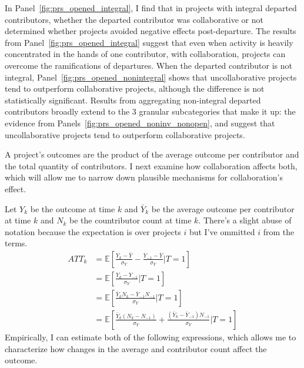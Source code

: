\documentclass[12pt,notitlepage]{article}
\begin{document}
In Panel~\ref{fig:prs_opened_integral}, I find that in projects with integral departed contributors, whether the departed contributor was collaborative or not determined whether projects avoided negative effects post-departure. The results from Panel~\ref{fig:prs_opened_integral} suggest that even when activity is heavily concentrated in the hands of one contributor, with collaboration, projects can overcome the ramifications of departures. When the departed contributor is not integral, Panel~\ref{fig:prs_opened_nonintegral} shows that uncollaborative projects tend to outperform collaborative projects, although the difference is not statistically significant. Results from aggregating non-integral departed contributors broadly extend to the 3 granular subcategories that make it up: the evidence from Panels~\ref{fig:prs_opened_noninv_nonopen},  and  suggest that uncollaborative projects tend to outperform collaborative projects. 



A project's outcomes are the product of the average outcome per contributor and the total quantity of contributors. I next examine how collaboration affects both, which will allow me to narrow down plausible mechanisms for collaboration's effect.


Let $Y_k$ be the outcome at time $k$ and $\bar Y_k$ be the average outcome per contributor at time $k$ and $N_k$ be the countributor count at time $k$. There's a slight abuse of notation because the expectation is over projects $i$ but I've ommitted $i$ from the terms. 
\begin{align*} 
  ATT_k &= \mathbb{E}\!\left[\frac{Y_k - \bar{Y}}{\sigma_Y}
             - \frac{Y_{-1} - \bar{Y}}{\sigma_Y}
             \Big| T=1\right] \\
           &= \mathbb{E}\!\left[\frac{Y_k - Y_{-1}}{\sigma_Y}
             \Big| T=1\right] \\
           &= \mathbb{E}\!\left[\frac{\bar{Y}_k N_k - \bar{Y}_{-1}N_{-1}}{\sigma_Y}
             \Big| T=1\right] \\
           &= \mathbb{E}\!\left[\frac{\bar Y_k (N_k - N_{-1})}{\sigma_Y}
             + \frac{(\bar Y_k - \bar Y_{-1}) N_{-1}}{\sigma_Y}
             \Big| T=1\right]
\end{align*}
Empirically, I can estimate both of the following expressions, which allows me to characterize how changes in the average and contributor count affect the outcome. 
\end{document}
